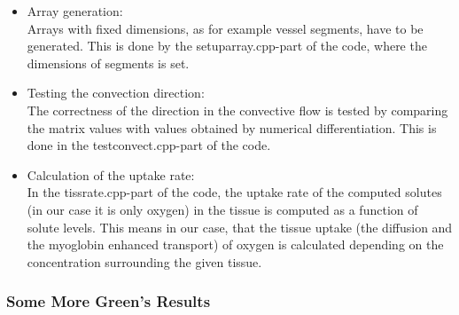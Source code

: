 \begin{itemize}
\\ \item Array generation:
\\Arrays with fixed dimensions, as for example vessel segments, have to be generated. This is done by the setuparray.cpp-part of the code, where the dimensions of segments is set.
\\ \item Testing the convection direction:
\\The correctness of the direction in the convective flow is tested by comparing the matrix values with values obtained by numerical differentiation. This is done in the testconvect.cpp-part of the code.
\\ \item Calculation of the uptake rate:
\\In the tissrate.cpp-part of the code, the uptake rate of the computed solutes (in our case it is only oxygen) in the tissue is computed as a function of solute levels. This means in our case, that the tissue uptake (the diffusion and the myoglobin enhanced transport) of oxygen is calculated depending on the concentration surrounding the given tissue.
\\
\end{itemize}

\subsubsection{Some More Green's Results}

